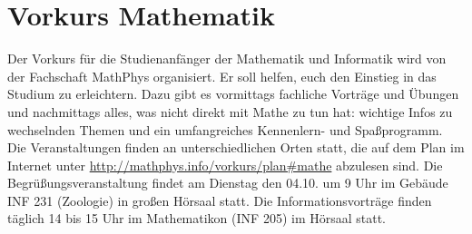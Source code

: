 \section{Vorkurs Mathematik}
\label{vkmathe}
Der Vorkurs für die Studienanfänger der Mathematik und Informatik wird von der
Fachschaft MathPhys organisiert. Er soll helfen, euch den Einstieg in das
Studium zu erleichtern. Dazu gibt es vormittags fachliche Vorträge und Übungen
und nachmittags alles, was nicht direkt mit Mathe zu tun hat: wichtige Infos zu
wechselnden Themen und ein umfangreiches Kennenlern- und Spaßprogramm. Die
Veranstaltungen finden an unterschiedlichen Orten statt, die auf dem Plan im
Internet unter \url{http://mathphys.info/vorkurs/plan\#mathe}
abzulesen sind. Die Begrüßungsveranstaltung findet am Dienstag den 04.10. um 9
Uhr im Gebäude \gls{INF} 231 (Zoologie) in großen Hörsaal statt. Die
Informationsvorträge finden täglich 14 bis 15 Uhr im Mathematikon
(\gls{INF} 205) im Hörsaal statt.
